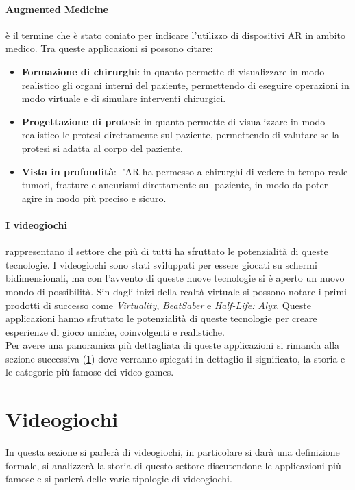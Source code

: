         \paragraph{Augmented Medicine} è il termine che è stato coniato per indicare l'utilizzo di dispositivi AR in ambito medico. Tra queste applicazioni si possono citare:
            \begin{itemize}
                \item \textbf{Formazione di chirurghi}: in quanto permette di visualizzare in modo realistico gli organi 
                    interni del paziente, permettendo di eseguire operazioni in modo virtuale e di simulare interventi chirurgici.
                \item \textbf{Progettazione di protesi}: in quanto permette di visualizzare in modo realistico le protesi 
                    direttamente sul paziente, permettendo di valutare se la protesi si adatta al corpo del paziente.
                \item \textbf{Vista in profondità}: l'AR ha permesso a chirurghi di vedere in tempo reale tumori, fratture e aneurismi direttamente sul paziente, in modo da poter 
                    agire in modo più preciso e sicuro.
            \end{itemize}

        \paragraph{I videogiochi} rappresentano il settore che più di tutti ha sfruttato le potenzialità di queste tecnologie. I videogiochi sono stati sviluppati per essere giocati 
            su schermi bidimensionali, ma con l'avvento di queste nuove tecnologie si è aperto un nuovo mondo di possibilità. Sin dagli inizi della realtà virtuale si possono notare
            i primi prodotti di successo come \textit{Virtuality}, \textit{BeatSaber} e \textit{Half-Life: Alyx}. Queste applicazioni hanno sfruttato le potenzialità di queste
            tecnologie per creare esperienze di gioco uniche, coinvolgenti e realistiche.\\
            Per avere una panoramica più dettagliata di queste applicazioni si rimanda alla sezione successiva (\ref{sec:Videogiochi}) dove verranno spiegati in dettaglio
            il significato, la storia e le categorie più famose dei video games.

\section{Videogiochi}\label{sec:Videogiochi}
    In questa sezione si parlerà di videogiochi, in particolare si darà una definizione formale, si analizzerà la storia di questo settore discutendone le applicazioni più famose e 
    si parlerà delle varie tipologie di videogiochi.
    
